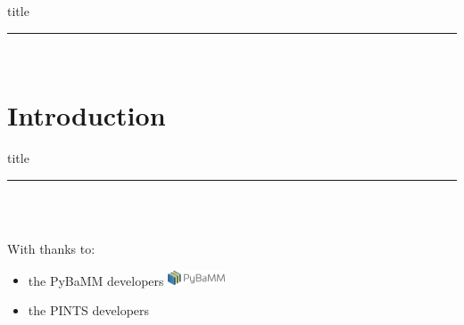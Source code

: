 \documentclass[aspectratio=169]{beamer}
\begin{document}
{
%
\begin{frame}[plain]
    \centering
    \begin{beamercolorbox}[sep=8pt,center,shadow=true,rounded=true]{title}
    {\color{white}\par}%
    \color{white}\noindent\rule{10cm}{1pt} \\
    {\color{white}\par}%
    \end{beamercolorbox}
\end{frame}
}

\section{Introduction}
\begin{frame}[plain]
    \centering
    \begin{beamercolorbox}[sep=8pt,center,shadow=true,rounded=true]{title}
    \insertsectionhead\par%
    \color{oxfordblue}\noindent\rule{10cm}{1pt} \\
    \LARGE{\faBatteryThreeQuarters} \\
    \end{beamercolorbox}
    \vspace{6mm} \normalsize
    \begin{flushleft}
        With thanks to:
    \end{flushleft}
    \begin{itemize}
        \item the PyBaMM developers \href{https://github.com/pybop-team/PyBOP}{\includegraphics[height=1.2em]{Theme/Logos/PyBaMM_logo.png}}
        \item the PINTS developers \href{https://github.com/pints-team/pints}{\faGithub}
    \end{itemize}
\end{frame}
\end{document}
